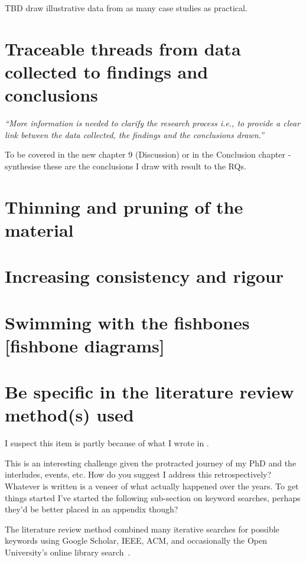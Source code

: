 TBD draw illustrative data from as many case studies as practical.

\section{Traceable threads from data collected to findings and conclusions}
\emph{``More information is needed to clarify the research process i.e., to provide a clear link between the data collected, the findings and the conclusions drawn.''}

To be covered in the new chapter 9 (Discussion) or in the Conclusion chapter - synthesise these are the conclusions I draw with result to the RQs.

\section{Thinning and pruning of the material}

\section{Increasing consistency and rigour}

\section{Swimming with the fishbones [fishbone diagrams]}

\section{Be specific in the literature review method(s) used}
\begin{kaobox}

    I suspect this item is partly because of what I wrote in .
    
    This is an interesting challenge given the protracted journey of my PhD and the interludes, events, etc. How do you suggest I address this retrospectively? Whatever is written is a veneer of what actually happened over the years. To get things started I've started the following sub-section on keyword searches, perhaps they'd be better placed in an appendix though?
\end{kaobox}

The literature review method combined many iterative searches for possible keywords using Google Scholar, IEEE, ACM, and occasionally the Open University's online library search~. 

